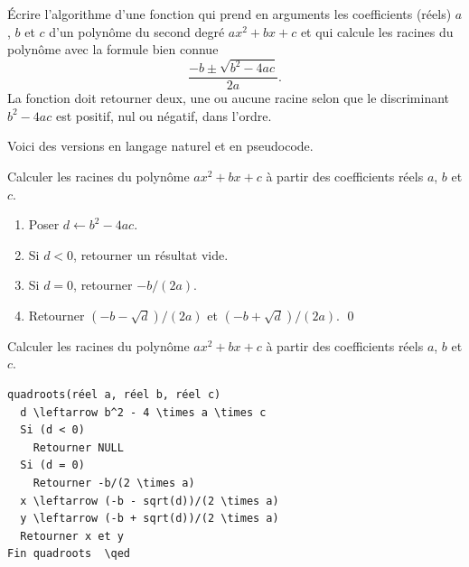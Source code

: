 \begin{exercice}
  Écrire l'algorithme d'une fonction  qui prend en
  arguments les coefficients (réels) $a$, $b$ et $c$ d'un polynôme du
  second degré $a x^2 + b x + c$ et qui calcule les racines du
  polynôme avec la formule bien connue
  \begin{equation*}
    \frac{-b \pm \sqrt{b^2 - 4ac}}{2a}.
  \end{equation*}
  La fonction doit retourner deux, une ou aucune racine selon que le
  discriminant $b^2 - 4ac$ est positif, nul ou négatif, dans l'ordre.
  \begin{sol}
    Voici des versions en langage naturel et en pseudocode.

    \begin{algorithme*}
      Calculer les racines du polynôme $a x^2 + b x + c$ à partir des
      coefficients réels $a$, $b$ et $c$.
      \begin{enumerate}[1.]
      \item Poser $d \leftarrow b^2 - 4ac$.
      \item Si $d < 0$, retourner un résultat vide.
      \item Si $d = 0$, retourner $-b/(2a)$.
      \item Retourner $(-b - \sqrt{d})/(2a)$ et
        $(-b + \sqrt{d})/(2a)$.
        \qed
      \end{enumerate}
    \end{algorithme*}

    \begin{algorithme*}
      Calculer les racines du polynôme $a x^2 + b x + c$ à partir des
      coefficients réels $a$, $b$ et $c$.
      \begin{pseudocode}
\begin{Verbatim}[commandchars=\\\{\}]
quadroots(réel a, réel b, réel c)
  d \leftarrow b^2 - 4 \times a \times c
  Si (d < 0)
    Retourner NULL
  Si (d = 0)
    Retourner -b/(2 \times a)
  x \leftarrow (-b - sqrt(d))/(2 \times a)
  y \leftarrow (-b + sqrt(d))/(2 \times a)
  Retourner x et y
Fin quadroots  \qed
\end{Verbatim}
      \end{pseudocode}
    \end{algorithme*}
  \end{sol}
\end{exercice}

